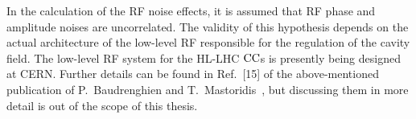 In the calculation of the RF noise effects, it is assumed that RF phase and amplitude noises are uncorrelated. The validity of this hypothesis depends on the actual architecture of the low-level RF responsible for the regulation of the cavity field. The low-level RF system for the HL-LHC ${\mathrm{CC}}$s is presently being designed at CERN. Further details can be found in Ref.~[15] of the above-mentioned publication of P.~Baudrenghien and T.~Mastoridis~\cite{PhysRevSTAB.18.101001}, but discussing them in more detail is out of the scope of this thesis.
 

